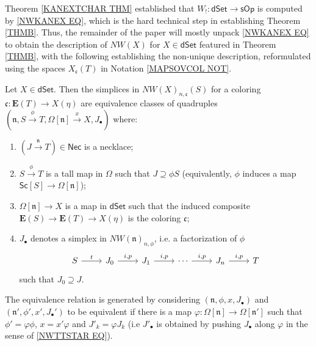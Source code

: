 \documentclass{hha}
\theoremstyle{definition} %
\newcommand{\sOp}{\mathsf{sOp}}
\newcommand{\dSet}{\mathsf{dSet}}
\begin{document}
Theorem \ref{KANEXTCHAR THM} established that 
$W_!\colon \dSet \to \sOp$ is computed by \eqref{NWKANEX EQ},
which is the hard technical step in establishing Theorem \ref{THMB}.
Thus, the remainder of the paper will mostly unpack \eqref{NWKANEX EQ}
to obtain the description of $NW(X)$ for $X \in \dSet$
featured in Theorem \ref{THMB},
with the following establishing the non-unique
description,
reformulated using the spaces $X_{\mathfrak{c}}(T)$ in
Notation \ref{MAPSOVCOL NOT}.


\begin{corollary}[{cf. \cite[Cor. 4.4]{DS11}}]
	\label{NWXREPS COR}
	Let $X\in \mathsf{dSet}$.
	Then the simplices in
	$NW(X)_{n,\mathfrak{c}}(S)$
	for a coloring 
	$\mathfrak{c}\colon \boldsymbol{E}(T) \to X(\eta)$
	are equivalence classes of quadruples
	$(\mathfrak{n}, S \xrightarrow{\phi} T, \Omega[\mathfrak{n}] \xrightarrow{x} X, J_{\bullet})$ 
	where:
	\begin{enumerate}[label=(\roman*)]
		\item $(J \xrightarrow{\mathfrak{n}} T) \in \mathsf{Nec}$ is a necklace; 
		\item $S \xrightarrow{\phi} T$
		is a tall map in $\Omega$
		such that $J \supseteq \phi S$
		(equivalently, $\phi$ induces a map
		$\mathsf{Sc}[S] \to \Omega[\mathfrak{n}]$);		
		\item $\Omega[ \mathfrak{n}] \to X$ is a map in $\mathsf{dSet}$
		such that the induced composite
		$\boldsymbol{E}(S) \to 
		\boldsymbol{E}(T) \to X(\eta)$
		is the coloring $\mathfrak{c}$;
		\item $J_{\bullet}$ denotes a simplex in $NW(\mathfrak{n})_{n,\phi}$, i.e.
		a factorization of $\phi$	
	\begin{equation}\label{STRINCOR EQ}
	\begin{tikzcd}
		S \ar{r}{t}
	&
		J_0 \ar{r}{i,p}
	&
		J_1 \ar{r}{i,p}
	&
		\cdots
		\ar{r}{i,p}
	&
		J_n \ar{r}{i,p}
	&
		T
	\end{tikzcd}
	\end{equation}
		such that 
		$J_0 \supseteq J$.
	\end{enumerate}
%
The equivalence relation is generated by considering 
$(\mathfrak{n},\phi,x,J_{\bullet})$ and
$(\mathfrak{n}',\phi',x',J_{\bullet}')$
to be equivalent if there is
a map
$\varphi \colon \Omega[\mathfrak{n}] \to \Omega[\mathfrak{n}']$
such that
$\phi' = \varphi \phi$,
$x = x' \varphi $
and
$J'_k = \varphi J_k$
(i.e $J'_{\bullet}$
is obtained by pushing 
$J_{\bullet}$ along $\varphi$
in the sense of \eqref{NWTTSTAR EQ}).
\end{corollary}
\end{document}
